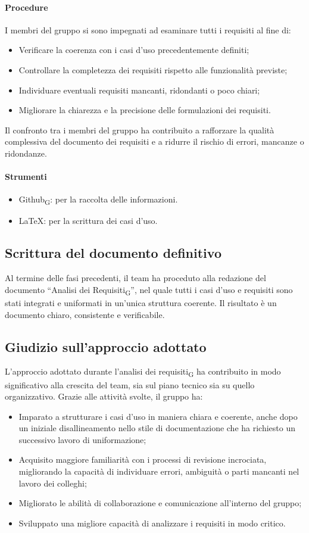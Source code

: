 \documentclass[11pt,a4paper]{article}
\newcommand{\gls}[1]{#1\textsubscript{G}}
\begin{document}
\paragraph{Procedure}
I membri del gruppo si sono impegnati ad esaminare tutti i requisiti al fine di:
\begin{itemize}
\item Verificare la coerenza con i casi d’uso precedentemente definiti;
\item Controllare la completezza dei requisiti rispetto alle funzionalità previste;
\item Individuare eventuali requisiti mancanti, ridondanti o poco chiari;
\item Migliorare la chiarezza e la precisione delle formulazioni dei requisiti.
\end{itemize}
Il confronto tra i membri del gruppo ha contribuito a rafforzare la qualità complessiva del documento dei requisiti e a ridurre il rischio di errori, mancanze o ridondanze.

\paragraph{Strumenti}
\begin{itemize}
\item \gls{Github}: per la raccolta delle informazioni.
\item LaTeX: per la scrittura dei casi d'uso.
\end{itemize}

\subsection{Scrittura del documento definitivo}
Al termine delle fasi precedenti, il team ha proceduto alla redazione del documento “\gls{Analisi dei Requisiti}”, nel quale tutti i casi d’uso e requisiti sono stati integrati e uniformati in un’unica struttura coerente. Il risultato è un documento chiaro, consistente e verificabile.

\subsection{Giudizio sull'approccio adottato}
L’approccio adottato durante l’\gls{analisi dei requisiti} ha contribuito in modo significativo alla crescita del team, sia sul piano tecnico sia su quello organizzativo. Grazie alle attività svolte, il gruppo ha:
\begin{itemize}
\item Imparato a strutturare i casi d’uso in maniera chiara e coerente, anche dopo un iniziale disallineamento nello stile di documentazione che ha richiesto un successivo lavoro di uniformazione;
\item Acquisito maggiore familiarità con i processi di revisione incrociata, migliorando la capacità di individuare errori, ambiguità o parti mancanti nel lavoro dei colleghi;
\item Migliorato le abilità di collaborazione e comunicazione all'interno del gruppo;
\item Sviluppato una migliore capacità di analizzare i requisiti in modo critico.
\end{itemize}
\end{document}
